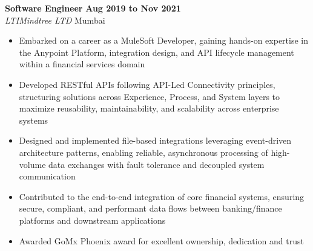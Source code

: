 \documentclass[11pt,a4paper]{article}
\begin{document}
\vspace{6pt}
\textbf{Software Engineer} \hfill \textbf{Aug 2019 to Nov 2021}\\
\textit{LTIMindtree LTD} \hfill Mumbai
\begin{itemize}
  \item Embarked on a career as a MuleSoft Developer, gaining hands-on expertise in the Anypoint Platform, integration design, and API lifecycle management within a financial services domain
  \item Developed RESTful APIs following API-Led Connectivity principles, structuring solutions across Experience, Process, and System layers to maximize reusability, maintainability, and scalability across enterprise systems
  \item Designed and implemented file-based integrations leveraging event-driven architecture patterns, enabling reliable, asynchronous processing of high-volume data exchanges with fault tolerance and decoupled system communication
  \item Contributed to the end-to-end integration of core financial systems, ensuring secure, compliant, and performant data flows between banking/finance platforms and downstream applications
  \item Awarded GoMx Phoenix award for excellent ownership, dedication and trust
\end{itemize}
\end{document}
